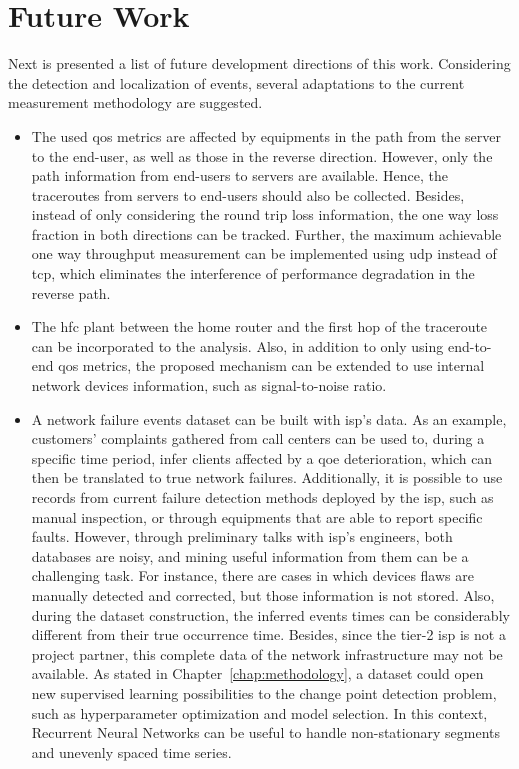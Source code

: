 \section{Future Work}
\label{sec:future_work}

Next is presented a list of future development directions of this work.
Considering the detection and localization of events, several adaptations to
the current measurement methodology are suggested.

\begin{itemize}
\item
The used \gls*{qos} metrics are affected by equipments in the path from the server to
the end-user, as well as those in the reverse direction.
However, only the path information from end-users to servers are available.
Hence, the traceroutes from servers to end-users should also be collected.
Besides, instead of only considering the round trip loss information,
the one way loss fraction in both directions can be tracked.
Further, the maximum achievable one way throughput measurement can be
implemented using \gls*{udp} instead of \gls*{tcp}, which eliminates the interference of
performance degradation in the reverse path.

\item
The \gls*{hfc} plant between the home router and the
first hop of the traceroute can be incorporated to the analysis.
Also, in addition to only using end-to-end \gls*{qos} metrics,
the proposed mechanism can be extended
to use internal network devices information, such as signal-to-noise ratio.

\item
A network failure events dataset can be built with \gls*{isp}'s data.
As an example, customers' complaints gathered from call centers can be used to,
during a specific time period, infer clients affected by a \gls*{qoe} deterioration,
which can then be translated to true network failures.
Additionally, it is possible to use records from current failure detection
methods deployed by the \gls*{isp}, such as manual inspection, or through equipments
that are able to report specific faults.
However, through preliminary talks with \gls*{isp}'s engineers,
both databases are noisy, and mining useful information
from them can be a challenging task.
For instance, there are cases in which devices flaws are manually
detected and corrected, but those information is not stored.
Also, during the dataset construction, the inferred events times can be
considerably different from their true occurrence time.
Besides, since the tier-2 \gls*{isp} is not a project partner, this
complete data of the network infrastructure may not be available.
As stated in Chapter~\ref{chap:methodology}, a dataset could open new
supervised learning possibilities to the change point detection problem, such
as hyperparameter optimization and model selection.
In this context, Recurrent Neural Networks can be useful to handle
non-stationary segments and unevenly spaced time series.


\end{itemize}
